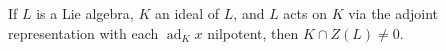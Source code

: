 If $L$ is a Lie algebra, $K$ an ideal of $L$, and $L$ acts on $K$ via the adjoint representation with each $\operatorname{ad}_K x$ nilpotent, then $K \cap Z(L) \neq 0$.
